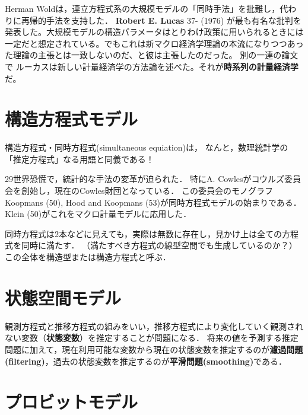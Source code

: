 \documentclass[uplatex,dvipdfmx]{jsreport}
\begin{document}
\begin{history}
    Herman Woldは，連立方程式系の大規模モデルの「同時手法」を批難し，代わりに再帰的手法を支持した．
    \textbf{Robert E. Lucas} 37- (1976) が最も有名な批判を発表した。大規模モデルの構造パラメータはとりわけ政策に用いられるときには一定だと想定されている。でもこれは新マクロ経済学理論の本流になりつつあった理論の主張とは一致しないのだ、と彼は主張したのだった。 別の一連の論文で ルーカスは新しい計量経済学の方法論を述べた。それが\textbf{時系列の計量経済学}だ。
\end{history}

\section{構造方程式モデル}

\begin{tcolorbox}[colframe=ForestGreen, colback=ForestGreen!10!white,breakable,colbacktitle=ForestGreen!40!white,coltitle=black,fonttitle=\bfseries\sffamily,
title=]
    構造方程式・同時方程式(simultaneous equiation)は，
    なんと，数理統計学の「推定方程式」なる用語と同義である！
\end{tcolorbox}

\begin{history}[同時方程式モデル]
    29世界恐慌で，統計的な手法の変革が迫られた．
    特にA. Cowlesがコウルズ委員会を創始し，現在のCowles財団となっている．
    この委員会のモノグラフKoopmans (50), Hood and Koopmans (53)が同時方程式モデルの始まりである．
    Klein (50)がこれをマクロ計量モデルに応用した．
\end{history}

同時方程式は2本などに見えても，実際は無数に存在し，見かけ上は全ての方程式を同時に満たす．
（満たすべき方程式の線型空間でも生成しているのか？）
この全体を構造型または構造方程式と呼ぶ．

\section{状態空間モデル}

観測方程式と推移方程式の組みをいい，推移方程式により変化していく観測されない変数（\textbf{状態変数}）を推定することが問題になる．
将来の値を予測する推定問題に加えて，現在利用可能な変数から現在の状態変数を推定するのが\textbf{濾過問題(filtering)}，過去の状態変数を推定するのが\textbf{平滑問題(smoothing)}である．

\section{プロビットモデル}
\end{document}
